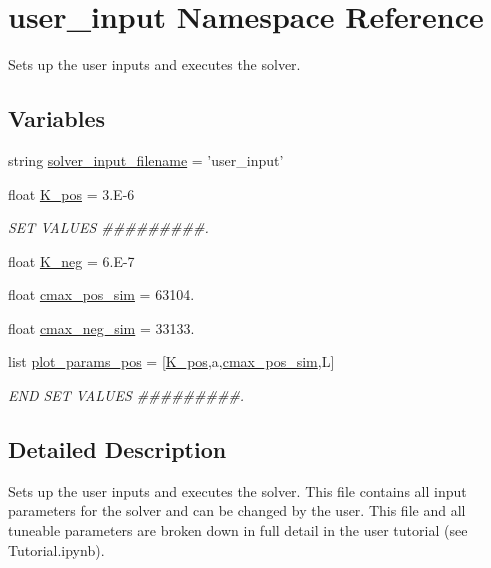 \hypertarget{namespaceuser__input}{\section{user\-\_\-input Namespace Reference}
\label{namespaceuser__input}
}


Sets up the user inputs and executes the solver.  


\subsection*{Variables}
\begin{DoxyCompactItemize}
\item 
string \hyperlink{namespaceuser__input_a92a75cd7aa57960ca65957a1baa06d77}{solver\-\_\-input\-\_\-filename} = 'user\-\_\-input'
\item 
float \hyperlink{namespaceuser__input_ab1a8ebec490ba1301f818bd1c5f1f3fa}{K\-\_\-pos} = 3.\-E-\/6
\begin{DoxyCompactList}\small\item\em S\-E\-T V\-A\-L\-U\-E\-S \#\#\#\#\#\#\#\#\#. \end{DoxyCompactList}\item 
float \hyperlink{namespaceuser__input_a64d0c5854299798787675bc91586023c}{K\-\_\-neg} = 6.\-E-\/7
\item 
float \hyperlink{namespaceuser__input_aa5b015cc7d0bda453c6163023448db72}{cmax\-\_\-pos\-\_\-sim} = 63104.
\item 
float \hyperlink{namespaceuser__input_ab7633a5e9c70aabfe6992e4fe521a1f9}{cmax\-\_\-neg\-\_\-sim} = 33133.
\item 
list \hyperlink{namespaceuser__input_a5bacef25baf63731923fbef674af4e9d}{plot\-\_\-params\-\_\-pos} = \mbox{[}\hyperlink{namespaceuser__input_ab1a8ebec490ba1301f818bd1c5f1f3fa}{K\-\_\-pos},a,\hyperlink{namespaceuser__input_aa5b015cc7d0bda453c6163023448db72}{cmax\-\_\-pos\-\_\-sim},L\mbox{]}
\begin{DoxyCompactList}\small\item\em E\-N\-D S\-E\-T V\-A\-L\-U\-E\-S \#\#\#\#\#\#\#\#\#. \end{DoxyCompactList}\end{DoxyCompactItemize}


\subsection{Detailed Description}
Sets up the user inputs and executes the solver. This file contains all input parameters for the solver and can be changed by the user. This file and all tuneable parameters are broken down in full detail in the user tutorial (see Tutorial.\-ipynb).

